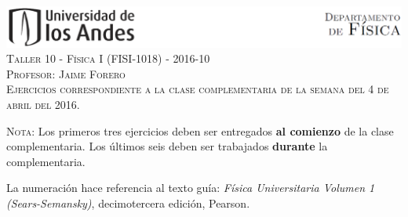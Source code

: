 \documentclass[letterpaper,10pt,onecolumn]{article}
\begin{document}
\begin{center}


\includegraphics[width=490pt]{header.png}\\[0.5cm]

\textsc{\LARGE Taller 10 - F\'isica I (FISI-1018) - 2016-10}\\[0.5cm]

\textsc{\Large{Profesor: Jaime Forero}} \\[0.5cm]

\noindent\textsc{Ejercicios correspondiente a la clase complementaria de la semana del 4 de abril del 2016.}\\[0.5cm]
\end{center}

\noindent\textsc{Nota:} 
Los primeros tres ejercicios deben ser
entregados {\bf al comienzo} de la clase complementaria. Los \'ultimos
seis deben ser trabajados {\bf durante} la complementaria. 

La numeraci\'on
hace referencia al texto gu\'ia: \textit{F\'isica Universitaria Volumen
  1 (Sears-Semansky)}, decimotercera edici\'on, Pearson.
\end{document}

